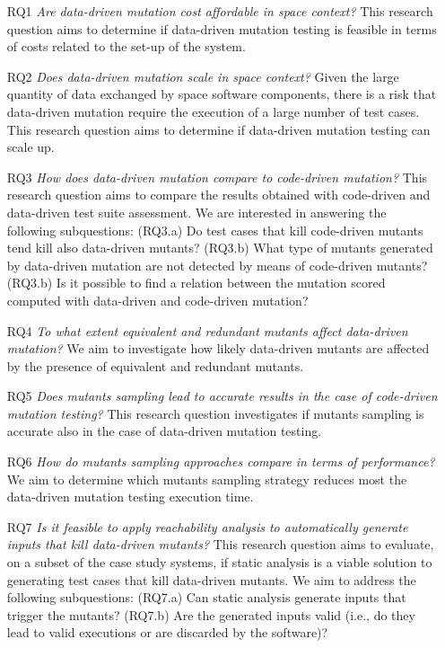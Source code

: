 \begin{itemize}

    \item[RQ1] \emph{Are data-driven mutation cost affordable in space context?} This research question aims to determine if data-driven mutation testing is feasible in terms of costs related to the set-up of the system.
    
        \item[RQ2] \emph{Does data-driven mutation scale in space context?} Given the large quantity of data exchanged by space software components, there is a risk that data-driven mutation require the execution of a large number of test cases. This research question aims to determine if data-driven mutation testing can scale up.
        
                \item[RQ3] \emph{How does data-driven mutation compare to code-driven mutation?} This research question aims to compare the results obtained with code-driven and data-driven test suite assessment. We are interested in answering the following subquestions: (RQ3.a) Do test cases that kill code-driven mutants tend kill also data-driven mutants? (RQ3.b) What type of mutants generated by data-driven mutation are not detected by means of code-driven mutants? (RQ3.b) Is it possible to find a relation between the mutation scored computed with data-driven  and code-driven mutation?
                
                \item[RQ4] \emph{To what extent equivalent and redundant mutants affect data-driven mutation?} We aim to investigate how likely data-driven mutants are affected by the presence of equivalent and redundant mutants.
                
                                \item[RQ5] \emph{Does mutants sampling lead to accurate results in the case of code-driven mutation testing?} This research question investigates if mutants sampling is accurate also in the case of data-driven mutation testing. 
                                
                                                 \item[RQ6] \emph{How do mutants sampling approaches compare in terms of performance?} We aim to determine which mutants sampling strategy reduces most the data-driven mutation testing execution time.                
                
                 \item[RQ7] \emph{Is it feasible to apply reachability analysis to automatically generate inputs that kill data-driven mutants?} This research question aims to evaluate, on a subset of the case study systems, if static analysis is a viable solution to generating test cases that kill data-driven mutants. We aim to address the following subquestions: (RQ7.a) Can static analysis generate inputs that trigger the mutants? (RQ7.b) Are the generated inputs valid (i.e., do they lead to valid executions or are discarded by the software)? 
    
    \end{itemize}
    
\ENDCHANGEDNOV    
